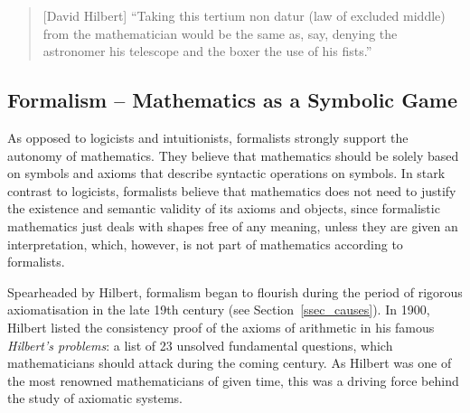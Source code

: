 \documentclass{article}
\begin{document}
\begin{quote}[David Hilbert]
``Taking this tertium non datur (law of excluded middle) from the mathematician would be the same as, say, denying the astronomer his telescope and the boxer the use of his fists.''\cite{hilbert_tertium_non_datur}
\end{quote}

\subsection{Formalism -- Mathematics as a Symbolic Game}\label{ssec_formalism}
As opposed to logicists and intuitionists, formalists strongly support the autonomy of mathematics. 
They believe that mathematics should be solely based on symbols and axioms that describe syntactic operations on symbols. In stark contrast to logicists, formalists believe that mathematics does not need to justify the existence and semantic validity of its axioms and objects, since formalistic mathematics just deals with shapes free of any meaning, unless they are given an interpretation, which, however, is not part of mathematics according to formalists.

Spearheaded by Hilbert, formalism began to flourish during the period of rigorous axiomatisation in the late 19th century (see Section~\ref{ssec_causes}). 
In 1900, Hilbert listed the consistency proof of the axioms of arithmetic in his famous \textit{Hilbert's problems}: a list of 23 unsolved fundamental questions, which mathematicians should attack during the coming century. As Hilbert was one of the most renowned mathematicians of given time, this was a driving force behind the study of axiomatic systems.
\end{document}
